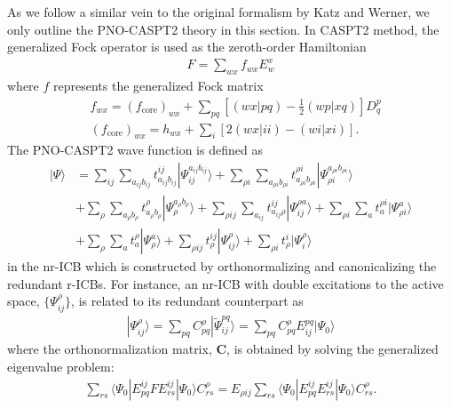 \documentclass[aip,jcp,amsmath,twocolumn,floatfix,reprint,fleqn]{revtex4-1}
\begin{document}
%
As we follow a similar vein to the original formalism by Katz and Werner,\cite{:/content/aip/journal/jcp/145/12/10.1063/1.4963019,doi:10.1063/1.5097644} we only outline the PNO-CASPT2 theory in this section.
%
In CASPT2 method, the generalized Fock operator is used as the zeroth-order Hamiltonian
%
\begin{align}
  F=\sum_{wx} f_{wx} E^x_w
\end{align}
%
where $f$ represents the generalized Fock matrix
%
\begin{align}
  &f_{wx} = (f_\text{core})_{wx} + \sum_{pq} \left[(wx|pq)-\frac{1}{2}(wp|xq)\right]D^p_q \\
  &(f_\text{core})_{wx} = h_{wx} + \sum_{i} [2(wx|ii)-(wi|xi)]. 
\end{align}
%
The PNO-CASPT2 wave function is defined as
%
\begin{align}
  |\Psi\rangle&=\sum_{ij}\sum_{a_{ij}b_{ij}} t_{a_{ij}b_{ij}}^{ij}|\Psi_{ij}^{a_{ij}b_{ij}}\rangle+\sum_{\rho i}\sum_{a_{\rho i}b_{\rho i}} t_{a_{\rho i}b_{\rho i}}^{\rho i}|\Psi_{{\rho i}}^{a_{\rho i}b_{\rho i}}\rangle \nonumber \\
  &+\sum_{\rho}\sum_{a_{\rho}b_{\rho}} t_{a_{\rho}b_{\rho}}^{\rho}|\Psi_{{\rho}}^{a_{\rho}b_{\rho}}\rangle + \sum_{\rho ij}\sum_{a_{ij}} t_{a_{ij}\rho}^{ij}|\Psi_{ij}^{\rho a}\rangle +\sum_{\rho i}\sum_a t_{a}^{\rho i}|\Psi_{\rho i}^{a}\rangle \nonumber \\
  &+\sum_{\rho}\sum_a t_{a}^\rho|\Psi_\rho^a\rangle + \sum_{\rho ij} t_{\rho}^{ij}|\Psi_{ij}^\rho\rangle+\sum_{\rho i} t_{\rho}^i|\Psi_{i}^\rho\rangle \label{eq:pno-caspt2}
\end{align}
%
in the nr-ICB which is constructed by orthonormalizing and canonicalizing the redundant r-ICBs.
%
For instance, an nr-ICB with double excitations to the active space, $\{\Psi^{\rho}_{ij}\}$, is related to its redundant counterpart as
%
\begin{align}
  |\Psi_{ij}^{\rho}\rangle=\sum_{pq} C_{pq}^{\rho} |\tilde{\Psi}_{ij}^{pq}\rangle = \sum_{pq} C_{pq}^{\rho} E_{ij}^{pq} |\Psi_0\rangle
\end{align}
%
where the orthonormalization matrix, $\mathbf{C}$, is obtained by solving the generalized eigenvalue problem:
%
\begin{align}
  \sum_{rs}\langle\Psi_0|E_{pq}^{ij}FE_{rs}^{ij}|\Psi_0\rangle C_{rs}^\rho=E_{\rho ij}\sum_{rs}\langle\Psi_0|E_{pq}^{ij}E_{rs}^{ij}|\Psi_0\rangle C_{rs}^\rho. \label{eq:eigen-Vp2}
\end{align}
\end{document}
